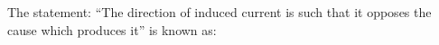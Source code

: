 The statement: “The direction of induced current is such that it opposes the cause which produces it” is known as:
